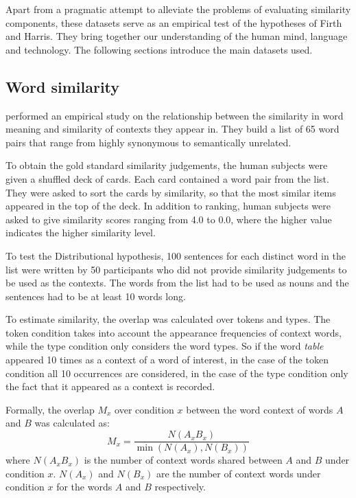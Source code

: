 Apart from a pragmatic attempt to alleviate the problems of evaluating
similarity components, these datasets serve as an empirical test of the
hypotheses of Firth and Harris. They bring together our understanding of the human mind, language and technology. The following sections introduce the main datasets used.

\subsection{Word similarity}
\label{sec:lexical-similarity}

 performed an empirical study on the relationship between the similarity in word meaning and similarity of contexts they appear in. They build a list of 65 word pairs that range from highly synonymous to semantically unrelated.

To obtain the gold standard similarity judgements, the human subjects were given a shuffled deck of cards. Each card contained a word pair from the list. They were asked to sort the cards by similarity, so that the most similar items appeared in the top of the deck. In addition to ranking, human subjects were asked to give similarity scores ranging from 4.0 to 0.0, where the higher value indicates the higher similarity level.

To test the Distributional hypothesis, 100 sentences for each distinct word in the list were written by 50 participants who did not provide similarity judgements to be used as the contexts. The words from the list had to be used as nouns and the sentences had to be at least 10 words long.

To estimate similarity, the overlap was calculated over tokens and types. The token condition takes into account the appearance frequencies of context words, while the type condition only considers the word types. So if the word \textit{table} appeared 10 times as a context of a word of interest, in the case of the token condition all 10 occurrences are considered, in the case of the type condition only the fact that it appeared as a context is recorded.

Formally, the overlap $M_x$ over condition $x$ between the word context of words $A$ and $B$ was calculated as:
%
\begin{equation*}
  M_x = \frac{N(A_xB_x)}{\min(N(A_x), N(B_x))}
\end{equation*}
%
where $N(A_xB_x)$ is the number of context words shared between $A$ and $B$ under condition $x$. $N(A_x)$ and $N(B_x)$ are the number of context words under condition $x$ for the words $A$ and $B$ respectively.

